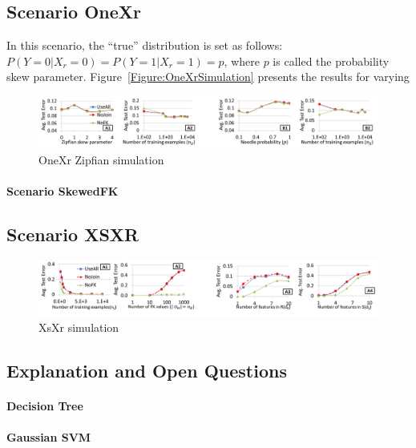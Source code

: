 \documentclass[sigconf]{acmart}
\begin{document}
\subsection{Scenario OneXr}
In this scenario, the ``true'' distribution is set as follows: $P(Y=0|X_r=0)=P(Y=1|X_r=1)=p$, where $p$ is called the probability skew parameter.
Figure~\ref{Figure:OneXrSimulation} presents the results for varying


\begin{figure}
\centering
\includegraphics[width=2\columnwidth,height=\textheight,keepaspectratio]{onexr_zipf.png}
\caption{OneXr Zipfian simulation}
\label{Figure:OneXrZipfSimulation}
\end{figure}

\paragraph*{Scenario SkewedFK}


\subsection{Scenario XSXR}

\begin{figure}
\centering
\includegraphics[width=2\columnwidth,height=\textheight,keepaspectratio]{xsxr.png}
\caption{XsXr simulation}
\label{Figure:XsXrSimulation}
\end{figure}

\subsection{Explanation and Open Questions}

\paragraph*{Decision Tree}

\paragraph*{Gaussian SVM}
\end{document}

